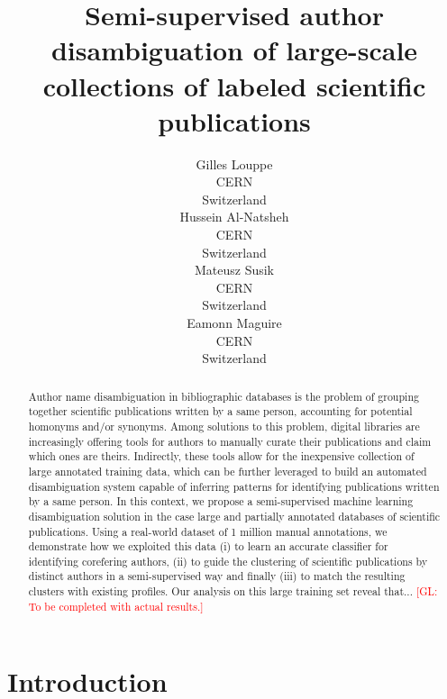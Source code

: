 \documentclass{article}
\title{Semi-supervised author disambiguation of large-scale collections of labeled scientific publications}
\author{Gilles Louppe\\
        CERN\\
        Switzerland\\
\And Hussein Al-Natsheh\\
        CERN\\
        Switzerland\\
\And Mateusz Susik\\
        CERN\\
        Switzerland\\
\And Eamonn Maguire\\
        CERN\\
        Switzerland}
\date{}
\newcommand{\glnote}[1]{\textcolor{red}{[GL: #1]}}
\begin{document}
\maketitle

\begin{abstract}

Author name disambiguation in bibliographic databases is the problem of
grouping together scientific publications written by a same person, accounting
for potential homonyms and/or synonyms. Among solutions to this problem, digital
libraries are increasingly offering tools for authors to manually curate their
publications and claim which ones are theirs. Indirectly, these tools allow for
the inexpensive collection of large annotated training data, which can be
further leveraged to build an automated disambiguation system capable of
inferring patterns for identifying publications written by a same
person.  In this context, we propose a semi-supervised machine learning
disambiguation solution in the case large and partially annotated databases of
scientific publications. Using a real-world dataset of 1 million manual
annotations, we demonstrate how we exploited this data (i) to learn an accurate
classifier for identifying corefering authors, (ii) to guide the clustering of
scientific publications by distinct authors in a semi-supervised way and
finally (iii) to match the resulting clusters with existing profiles.  Our
analysis on this large training set reveal that...
\glnote{To be completed with actual results.}

\end{abstract}



\section{Introduction}
\label{introduction}

\end{document}
